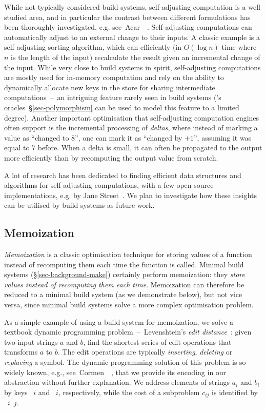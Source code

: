 While not typically considered build systems, self-adjusting computation is a
well studied area, and in particular the contrast between different formulations
has been thoroughly investigated, e.g.
see~Acar~\etal~. Self-adjusting computations
can automatically adjust to an external change to their inputs. A classic
example is a self-adjusting sorting algorithm, which can efficiently (in
$O(\log{n})$ time where $n$ is the length of the input) recalculate the result
given an incremental change of the input. While very close to build systems in
spirit, self-adjusting computations are mostly used for in-memory computation
and rely on the ability to dynamically allocate new keys in the store for
sharing intermediate computations~--~an intriguing feature rarely seen in build
systems (\Shake's oracles~\S\ref{sec-polymorphism} can be used to model this
feature to a limited degree). Another important optimisation that self-adjusting
computation engines often support is the incremental processing of
\emph{deltas}, where instead of marking a value as ``changed to 8'', one can
mark it as ``changed by $+1$'', assuming it was equal to 7 before. When a delta
is small, it can often be propagated to the output more efficiently than by
recomputing the output value from scratch.

A lot of research has been dedicated to finding efficient data structures and
algorithms for self-adjusting computations, with a few open-source
implementations, e.g. \Incremental by Jane Street~. We
plan to investigate how these insights can be utilised by build systems as
future work.

\subsection{Memoization}\label{sec-related-memo}

\emph{Memoization} is a classic optimisation technique for storing values of a
function instead of recomputing them each time the function is called. Minimal
build systems (\S\ref{sec-background-make}) certainly perform
memoization: they \emph{store values instead of recomputing them each time}.
Memoization can therefore be reduced to a minimal build system (as we
demonstrate below), but not vice versa, since minimal build systems solve a more
complex optimisation problem.

As a simple example of using a build system for memoization, we solve a textbook
dynamic programming problem~--~Levenshtein's \emph{edit
distance}~\cite{levenshtein1966binary}: given two input strings $a$ and
$b$, find the shortest series of edit operations that transforms $a$
to $b$. The edit operations are typically \emph{inserting}, \emph{deleting} or
\emph{replacing} a symbol. The dynamic programming solution of this problem is
so widely known, e.g., see~Cormen~\etal~, that
we provide its encoding in our  abstraction without further
explanation. We address elements of strings $a_i$ and $b_i$ by keys ~$i$
and ~$i$, respectively, while the cost of a subproblem $c_{ij}$ is
identified by ~$i$~$j$.

